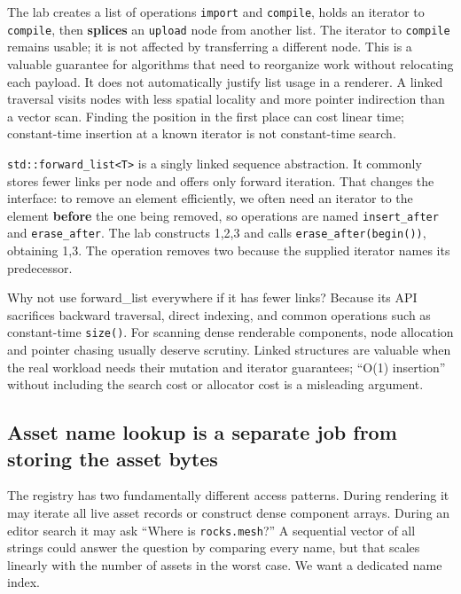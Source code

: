 The lab creates a list of operations \texttt{import} and \texttt{compile}, holds an iterator to \texttt{compile}, then \textbf{splices} an \texttt{upload} node from another list. The iterator to \texttt{compile} remains usable; it is not affected by transferring a different node. This is a valuable guarantee for algorithms that need to reorganize work without relocating each payload. It does not automatically justify list usage in a renderer. A linked traversal visits nodes with less spatial locality and more pointer indirection than a vector scan. Finding the position in the first place can cost linear time; constant-time insertion at a known iterator is not constant-time search.

\texttt{std::forward\_list\textless{}T\textgreater{}} is a singly linked sequence abstraction. It commonly stores fewer links per node and offers only forward iteration. That changes the interface: to remove an element efficiently, we often need an iterator to the element \textbf{before} the one being removed, so operations are named \texttt{insert\_after} and \texttt{erase\_after}. The lab constructs 1,2,3 and calls \texttt{erase\_after(begin())}, obtaining 1,3. The operation removes two because the supplied iterator names its predecessor.

Why not use forward\_list everywhere if it has fewer links? Because its API sacrifices backward traversal, direct indexing, and common operations such as constant-time \texttt{size()}. For scanning dense renderable components, node allocation and pointer chasing usually deserve scrutiny. Linked structures are valuable when the real workload needs their mutation and iterator guarantees; ``O(1) insertion'' without including the search cost or allocator cost is a misleading argument.

\subsection{Asset name lookup is a separate job from storing the asset bytes}\label{01-foundations-i-ch006-asset-name-lookup-is-a-separate-job-from-storing-the-asset-bytes}

The registry has two fundamentally different access patterns. During rendering it may iterate all live asset records or construct dense component arrays. During an editor search it may ask ``Where is \texttt{rocks.mesh}?'' A sequential vector of all strings could answer the question by comparing every name, but that scales linearly with the number of assets in the worst case. We want a dedicated name index.


